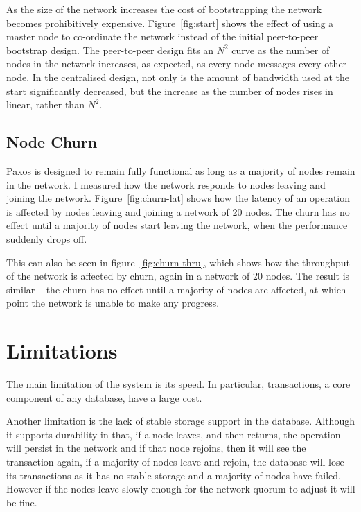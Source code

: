 \documentclass[12pt,twoside,notitlepage]{report}
\begin{document}
As the size of the network increases the cost of bootstrapping the network becomes prohibitively
expensive. Figure~\ref{fig:start} shows the effect of using a master node to co-ordinate the
network instead of the initial peer-to-peer bootstrap design. The peer-to-peer design fits an
$N^2$ curve as the number of nodes in the network increases, as expected, as every node messages
every other node. In the centralised design, not only is the amount of bandwidth used at the start
significantly decreased, but the increase as the number of nodes rises in linear, rather than
$N^2$.

\subsection{Node Churn}

\begin{figure}[Hhtb]
\centering
{}
\end{figure}

Paxos is designed to remain fully functional as long as a majority of nodes remain in the network.
I measured how the network responds to nodes leaving and joining the network.
Figure~\ref{fig:churn-lat} shows how the latency of an operation is affected by nodes leaving and
joining a network of 20 nodes. The churn has no effect until a majority of nodes start leaving the
network, when the performance suddenly drops off.

This can also be seen in figure~\ref{fig:churn-thru}, which shows how the throughput of the
network is affected by churn, again in a network of 20 nodes. The result is similar -- the churn
has no effect until a majority of nodes are affected, at which point the network is unable to make
any progress.

\section{Limitations}

The main limitation of the system is its speed. In particular, transactions, a core component of
any database, have a large cost.

Another limitation is the lack of stable storage support in the database. Although it supports
durability in that, if a node leaves, and then returns, the operation will persist in the network
and if that node rejoins, then it will see the transaction again, if a majority of nodes leave and
rejoin, the database will lose its transactions as it has no stable storage and a majority of
nodes have failed. However if the nodes leave slowly enough for the network quorum to adjust it
will be fine.
\end{document}

